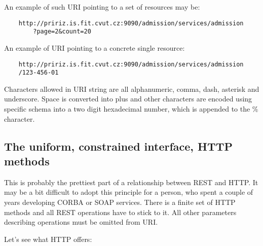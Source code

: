 	An example of such URI pointing to a set of resources may be:
	
	\begin{verbatim}
	http://pririz.is.fit.cvut.cz:9090/admission/services/admission
		?page=2&count=20
	\end{verbatim}
	 
	An example of URI pointing to a concrete single resource:
	
	\begin{verbatim}
	http://pririz.is.fit.cvut.cz:9090/admission/services/admission
	/123-456-01
	\end{verbatim}
	
	Characters allowed in \gls{URI} string are all alphanumeric, comma, dash, asterisk and underscore. Space is converted
	into plus and other characters are encoded using specific schema into a two digit hexadecimal number, which is appended
	to the \% character.
	
	\subsection{The uniform, constrained interface, HTTP methods}
	
	This is probably the prettiest part of a relationship between REST and HTTP. It may be a bit difficult to adopt this
	principle for a person, who spent a couple of years developing CORBA or SOAP services.  There is a finite set of HTTP
	methods and all REST operations have to stick to it. All other parameters describing operations must be omitted from
	\gls{URI}.

	Let's see what \gls{HTTP} offers:
	
